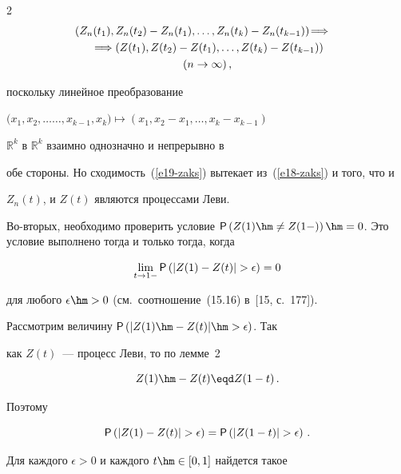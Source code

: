 \begin{multicols}{2}
\begin{multline}

\hspace*{-10pt}\left(Z_n(t_1),Z_n(t_2)-Z_n(t_1),\ldots ,Z_n(t_k)-Z_n(t_{k-1})\right)\!

\Longrightarrow{}\hspace*{-2.87125pt}

\\

{}\Longrightarrow

\left(Z(t_1),Z(t_2)-Z(t_1),\ldots ,Z(t_k)-Z(t_{k-1})\right)\\

(n\to\infty)\,,\label{e19-zaks}

\end{multline}

поскольку линейное преобразование

$(x_1,x_2,\ldots$\linebreak $\ldots ,x_{k-1},x_k)\longmapsto (x_1,x_2-x_1,\ldots ,x_k-x_{k-1})$

$\mathbb{R}^k$ в $\mathbb{R}^k$ взаимно однозначно и непрерывно в

обе стороны. Но сходимость~(\ref{e19-zaks}) вытекает из~(\ref{e18-zaks}) и того, что и

$Z_n(t)$, и $Z(t)$ являются процессами Леви.



Во-вторых, необходимо проверить условие ${\sf P}\left(Z(1)\hm\neq

Z(1-)\right)\hm=0$. Это условие выполнено тогда и только тогда, когда

$$

\lim\limits_{t\to1-}{\sf P}\left(|Z(1)-Z(t)|>\epsilon\right)=0

$$

для любого $\epsilon\hm>0$ (см.\ соотношение~(15.16) в~[15, с.~177]).

Рассмотрим величину ${\sf P}\left(|Z(1)\hm-Z(t)|\hm>\epsilon\right)$. Так

как $Z(t)$~--- процесс Леви, то по лемме~2 

$$

Z(1)\hm-Z(t)\eqd Z(1-t)\,.

$$

Поэтому

$$

{\sf P}\left(|Z(1)-Z(t)|>\epsilon\right)={\sf P}\left(|Z(1-t)|>\epsilon\right)\,.

$$

Для каждого $\epsilon>0$ и каждого $t\hm\in[0,1]$ найдется такое


\end{multicols}
